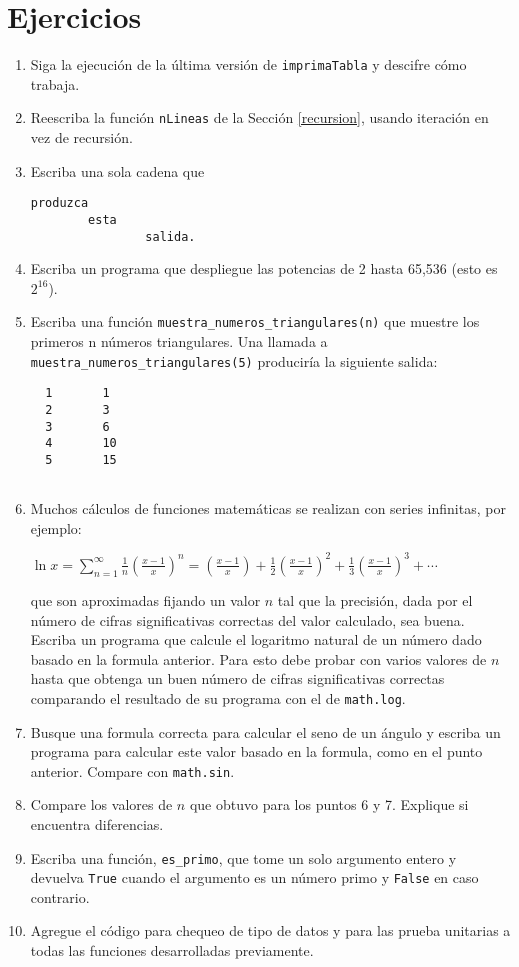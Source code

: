 \section{Ejercicios}
\begin{enumerate}
\item Siga la ejecución de la última versión de \texttt{imprimaTabla} y
descifre cómo trabaja. 
\item Reescriba la función \texttt{nLineas} de la Sección \ref{recursion},
usando iteración en vez de recursión. 
\item Escriba una sola cadena que

\beforeverb 
\begin{verbatim}
produzca
        esta
                salida.
\end{verbatim}
\afterverb
\item Escriba un programa que despliegue las potencias de 2 hasta 65,536
(esto es $2^{16}$).
\item Escriba una función \verb+muestra_numeros_triangulares(n)+ que muestre
los primeros n números triangulares. Una llamada a \verb+muestra_numeros_triangulares(5)+
produciría la siguiente salida: \beforeverb 

\begin{verbatim}
  1       1
  2       3
  3       6
  4       10
  5       15
  
\end{verbatim}
\afterverb
\item Muchos cálculos de funciones matemáticas se realizan con series infinitas,
por ejemplo:

$\ln{x}=\sum_{n=1}^{\infty}\frac{1}{{n}}\left(\frac{x-1}{x}\right)^{n}=\left(\frac{x-1}{x}\right)+\frac{1}{2}\left(\frac{x-1}{x}\right)^{2}+\frac{1}{3}\left(\frac{x-1}{x}\right)^{3}+\cdots$

que son aproximadas fijando un valor $n$ tal que la precisión, dada
por el número de cifras significativas correctas del valor calculado,
sea buena. Escriba un programa que calcule el logaritmo natural de
un número dado basado en la formula anterior. Para esto debe probar
con varios valores de $n$ hasta que obtenga un buen número de cifras
significativas correctas comparando el resultado de su programa con
el de \verb+math.log+.
\item Busque una formula correcta para calcular el seno de un ángulo y escriba
un programa para calcular este valor basado en la formula, como en
el punto anterior. Compare con \verb+math.sin+.
\item Compare los valores de $n$ que obtuvo para los puntos 6 y 7. Explique
si encuentra diferencias.
\item Escriba una función, \verb+es_primo+, que tome un solo argumento
entero y devuelva \verb+True+ cuando el argumento es un número primo
y \verb+False+ en caso contrario.
\item Agregue el código para chequeo de tipo de datos y para las prueba
unitarias a todas las funciones desarrolladas previamente.
\end{enumerate}

